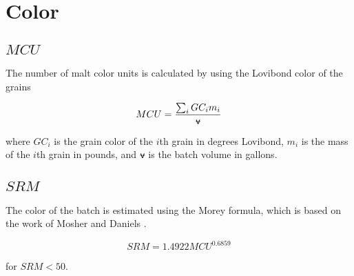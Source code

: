 \documentclass[../main.tex]{subfiles}
\begin{document}
\section{Color}

    \subsection{$MCU$}
    The number of malt color units is calculated by using the Lovibond color of the grains
    
        \begin{equation}
            MCU = \frac{\sum_{i}GC_{i}m_{i}}{\vol}
        \end{equation}
        
    where $GC_{i}$ is the grain color of the $i$th grain in degrees Lovibond, $m_{i}$ is the mass of the $i$th grain in pounds, and $\vol$ is the batch volume in gallons.
    
    \subsection{$SRM$}
    The color of the batch is estimated using the Morey formula, which is based on the work of Mosher and Daniels \cite{morey}.
    
        \begin{equation}
            SRM = 1.4922 MCU^{0.6859}
            \label{eq:srm}
        \end{equation}
    
    for $SRM < 50$.
\end{document}
